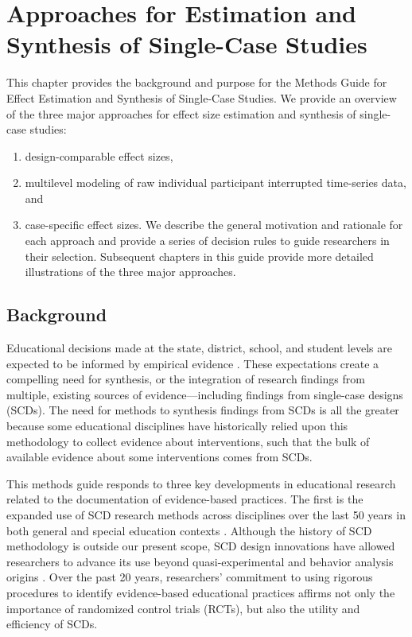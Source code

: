 \documentclass[
]{book}
\providecommand{\tightlist}{%
  \setlength{\itemsep}{0pt}\setlength{\parskip}{0pt}}
\begin{document}
\hypertarget{intro}{%
\chapter{Approaches for Estimation and Synthesis of Single-Case Studies}\label{intro}}


This chapter provides the background and purpose for the Methods Guide for Effect Estimation and Synthesis of Single-Case Studies.
We provide an overview of the three major approaches for effect size estimation and synthesis of single-case studies:

\begin{enumerate}
\def\labelenumi{(\alph{enumi})}
\tightlist
\item
  design-comparable effect sizes,
\item
  multilevel modeling of raw individual participant interrupted time-series data, and
\item
  case-specific effect sizes.
  We describe the general motivation and rationale for each approach and provide a series of decision rules to guide researchers in their selection.
  Subsequent chapters in this guide provide more detailed illustrations of the three major approaches.
\end{enumerate}

\hypertarget{background}{%
\section{Background}\label{background}}

Educational decisions made at the state, district, school, and student levels are expected to be informed by empirical evidence \citep{cook2014council, whatworksclearinghouse2020What}.
These expectations create a compelling need for synthesis, or the integration of research findings from multiple, existing sources of evidence---including findings from single-case designs (SCDs).
The need for methods to synthesis findings from SCDs is all the greater because some educational disciplines have historically relied upon this methodology to collect evidence about interventions, such that the bulk of available evidence about some interventions comes from SCDs.

This methods guide responds to three key developments in educational research related to the documentation of evidence-based practices.
The first is the expanded use of SCD research methods across disciplines over the last 50 years in both general and special education contexts \citep{Kratochwill2014Visual}.
Although the history of SCD methodology is outside our present scope, SCD design innovations have allowed researchers to advance its use beyond quasi-experimental and behavior analysis origins \citep[see][ for more detailed information on the history of SCD]{Kratochwill2014Visual}.
Over the past 20 years, researchers' commitment to using rigorous procedures to identify evidence-based educational practices affirms not only the importance of randomized control trials (RCTs), but also the utility and efficiency of SCDs.
\end{document}

